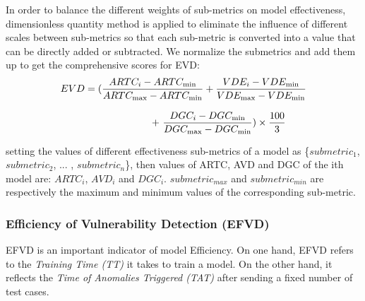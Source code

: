 In order to balance the different weights of sub-metrics on model effectiveness, dimensionless quantity method is applied to eliminate the influence of different scales between sub-metrics so that each sub-metric is converted into a value that can be directly added or subtracted. We normalize the submetrics and add them up to get the comprehensive scores for EVD:
\begin{equation}
\begin{array}{l}
EVD=(\displaystyle\frac{{ART{C_i} - ART{C_{\min }}}}{{ART{C_{\max }} - ART{C_{\min }}}} + \frac{{VD{E_i} - VD{E_{\min }}}}{{VD{E_{\max }} - VD{{E}_{\min }}}}\\
\\{\kern 1pt} {\kern 1pt} {\kern 1pt} {\kern 1pt} {\kern 1pt} {\kern 1pt} {\kern 1pt} {\kern 1pt} {\kern 1pt} {\kern 1pt} {\kern 1pt} {\kern 1pt} {\kern 1pt} {\kern 1pt} {\kern 1pt} {\kern 1pt} {\kern 1pt} {\kern 1pt} {\kern 1pt} {\kern 1pt} {\kern 1pt} {\kern 1pt} {\kern 1pt} {\kern 1pt} {\kern 1pt} {\kern 1pt} {\kern 1pt} {\kern 1pt} {\kern 1pt} {\kern 1pt} {\kern 1pt} {\kern 1pt} {\kern 1pt} {\kern 1pt} {\kern 1pt} {\kern 1pt} {\kern 1pt} {\kern 1pt} {\kern 1pt} {\kern 1pt} {\kern 1pt} {\kern 1pt} {\kern 1pt} {\kern 1pt} {\kern 1pt} {\kern 1pt} {\kern 1pt} {\kern 1pt} {\kern 1pt} {\kern 1pt} {\kern 1pt} {\kern 1pt} {\kern 1pt} {\kern 1pt} {\kern 1pt} {\kern 1pt} {\kern 1pt} {\kern 1pt} {\kern 1pt} {\kern 1pt} {\kern 1pt} {\kern 1pt} {\kern 1pt} {\kern 1pt} {\kern 1pt} {\kern 1pt} {\kern 1pt} {\kern 1pt} {\kern 1pt} {\kern 1pt} {\kern 1pt} {\kern 1pt} {\kern 1pt} {\kern 1pt} {\kern 1pt} {\kern 1pt} {\kern 1pt} {\kern 1pt} {\kern 1pt} {\kern 1pt} {\kern 1pt} {\kern 1pt} {\kern 1pt} {\kern 1pt} {\kern 1pt} {\kern 1pt} {\kern 1pt}  {\kern 1pt} {\kern 1pt} {\kern 1pt}  
+ {\kern 1pt} \displaystyle\frac{{DG{C_i} - DG{C_{\min }}}}{{DG{C_{\max }} - DG{C_{\min }}}}) \times \displaystyle\frac{{100}}{3}{\kern 1pt}
\end{array}
\end{equation}

setting the values of different effectiveness sub-metrics of a model as \{${{submetric}_1}$, ${submetric_2}$, ... , ${submetric_n}$\}, then values of ARTC, AVD and DGC of the ith model are: ${ARTC_i}$, ${AVD_i}$ and ${DGC_i}$. ${{submetric}_{max}}$ and ${{submetric}_{min}}$ are respectively the maximum and minimum values of the corresponding sub-metric.

\subsubsection{\textbf{Efficiency of Vulnerability Detection (EFVD)}}
EFVD is an important indicator of model Efficiency. On one hand, EFVD refers to the \textit{Training Time (TT)} it takes to train a model. On the other hand, it reflects the \textit{Time of Anomalies Triggered (TAT)} after sending a fixed number of test cases. 

